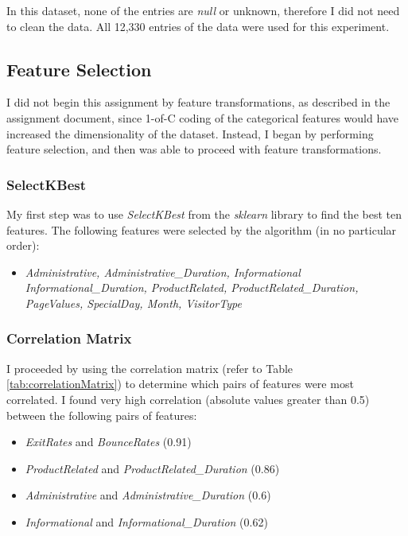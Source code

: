 \documentclass{article}
\begin{document}
In this dataset, none of the entries are \emph{null} or unknown, therefore I did not need to clean the data. All 12,330 entries of the data were used for this experiment.

\subsection{Feature Selection}

I did not begin this assignment by feature transformations, as described in the assignment document, since 1-of-C coding of the categorical features would have increased the dimensionality of the dataset. Instead, I began by performing feature selection, and then was able to proceed with feature transformations. 

\subsubsection{SelectKBest}

My first step was to use \emph{SelectKBest} from the \emph{sklearn} library to find the best ten features. The following features were selected by the algorithm (in no particular order):

\begin{itemize}
\item \emph{Administrative, Administrative\_Duration, Informational	Informational\_Duration, ProductRelated, ProductRelated\_Duration, PageValues, SpecialDay, Month, VisitorType}
\end{itemize}

\subsubsection{Correlation Matrix}

I proceeded by using the correlation matrix (refer to Table \ref{tab:correlationMatrix}) to determine which pairs of features were most correlated. I found very high correlation (absolute values greater than 0.5) between the following pairs of features:
\begin{itemize}
  \item \emph{ExitRates} and \emph{BounceRates} (0.91)
  \item \emph{ProductRelated} and \emph{ProductRelated\_Duration} (0.86)
  \item \emph{Administrative} and \emph{Administrative\_Duration} (0.6)
\item \emph{Informational} and \emph{Informational\_Duration} (0.62)
\end{itemize}
\end{document}
